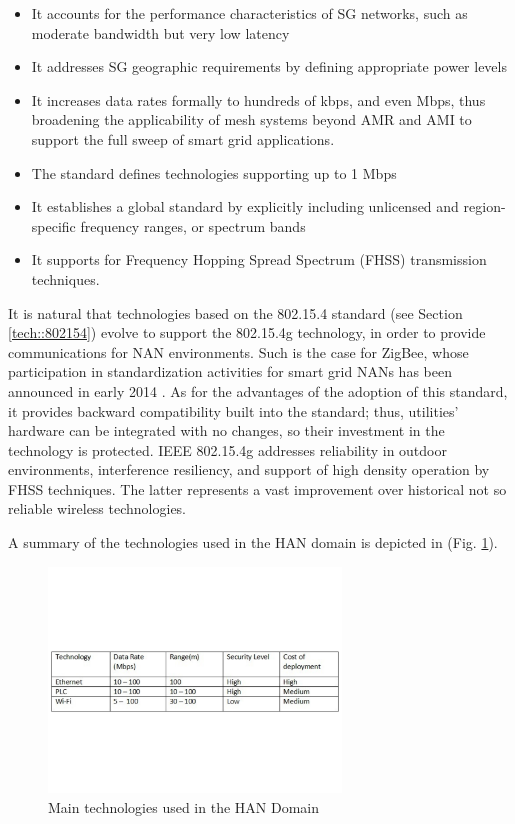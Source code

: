 \documentclass[11pt,draftclsnofoot,onecolumn]{IEEEtran}
\begin{document}
\begin{itemize}
	\item It accounts for the performance characteristics of SG networks, such as moderate bandwidth but very low latency
	\item It addresses SG geographic requirements by defining appropriate power levels
	\item It increases data rates formally to hundreds of kbps, and even Mbps, thus broadening the applicability of mesh systems beyond AMR and AMI to support the full sweep of smart grid applications. 
	\item The standard defines technologies supporting up to 1 Mbps
	\item It establishes a global standard by explicitly including unlicensed and region-specific frequency ranges, or spectrum bands
	\item It supports for Frequency Hopping Spread Spectrum (FHSS) transmission techniques.
\end{itemize}

It is natural that technologies based on the 802.15.4 standard (see Section \ref{tech::802154}) evolve to support the 802.15.4g technology, in order to provide communications for NAN environments. Such is the case for ZigBee, whose participation in standardization activities for smart grid NANs has been announced in early 2014 \cite{ZigBeeNAN}. As for the advantages of the adoption of this standard, it provides backward compatibility built into the standard; thus, utilities' hardware can be integrated with no changes, so their investment in the technology is protected. IEEE 802.15.4g addresses reliability in outdoor environments, interference resiliency, and support of high density operation by FHSS techniques. The latter represents a vast improvement over historical not so reliable wireless technologies.

A summary of the technologies used in the HAN domain is depicted in  (Fig. \ref{fig:han}).

\begin{figure}[h!]
\centering
\includegraphics [height=6cm] {HANTechnologies}
\caption{Main technologies used in the HAN Domain}
\label{fig:han}
\end{figure}
\end{document}
